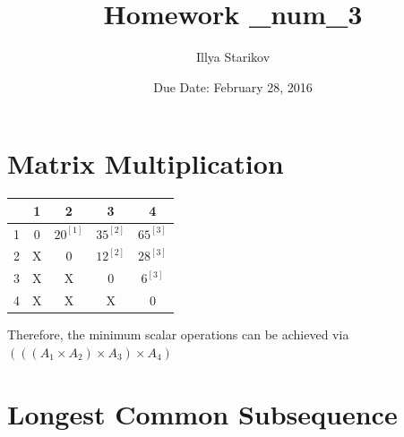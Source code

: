 \documentclass{article}
\title{Homework \_num_3}
\author{Illya Starikov}
\date{Due Date: February 28, 2016}
\begin{document}
\maketitle

\section{Matrix Multiplication}
\begin{tabular}{ c|c|c|c|c| }
  & 1 & 2 & 3 & 4 \\ \hline
1 & 0 & $20 ^{[1]}$ & $35^{[2]}$ & $65^{[3]}$  \\ \hline
2 & X & 0 & $12 ^{[2]}$ & $28^{[3]}$ \\ \hline
3 & X & X & 0 & $6^{[3]}$ \\ \hline
4 & X & X & X & 0  \\ \hline
\end{tabular}

\noindent
Therefore, the minimum scalar operations can be achieved via $(((A_1 \times A_2) \times A_3) \times A_4)$

\section{Longest Common Subsequence}
\end{document}
